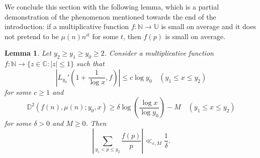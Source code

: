 \documentclass[12pt]{amsart}
\newtheorem{lemma}[theorem]{Lemma}
\theoremstyle{remark}
\newcommand {\SN} {{\mathbb N}}
\newcommand {\SC} {{\mathbb C}}
\newcommand {\SU} {{\mathbb U}}
\newcommand {\SD} {{\mathbb D}}
\numberwithin{equation}{section}
\begin{document}
We conclude this section with the following lemma, which is a partial demonstration of the phenomenon mentioned towards the end of the introduction: if a multiplicative function $f:\SN\to\SU$ is small on average and it does not pretend to be $\mu(n)n^{it}$ for some $t$, then $f(p)$ is small on average.

\begin{lemma}\label{dist1} Let $y_2\ge y_1\ge y_0\ge2$. Consider a multiplicative function $f:\SN\to\{z\in\SC:|z|\le1\}$ such that $$\left|L_{y_0}'\left(1+\frac1{\log x},f\right)\right|\le c\log y_0\quad(y_1\le x\le y_2)$$ for some $c\ge1$ and $$\SD^2(f(n),\mu(n);y_0,x)\ge\delta\log\left(\frac{\log x}{\log y_0}\right)-M\quad(y_1\le x\le y_2)$$ for some $\delta>0$ and $M\ge0$. Then $$\left|\sum_{y_1<p\le y_2}\frac{f(p)}p\right|\ll_{c,M}\frac1\delta.$$
\end{lemma}
\end{document}
